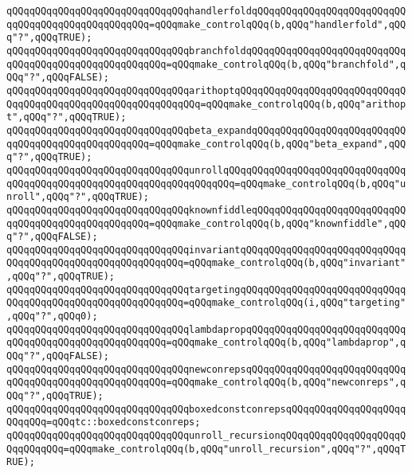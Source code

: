 \verb|qQQqqQQqqQQqqQQqqQQqqQQqqQQqqQQqhandlerfoldqQQqqQQqqQQqqQQqqQQqqQQqqQQqqQQqqQQqqQQqqQQqqQQqqQQq=qQQqmake_controlqQQq(b,qQQq"handlerfold",qQQq"?",qQQqTRUE);|\newline
\verb|qQQqqQQqqQQqqQQqqQQqqQQqqQQqqQQqbranchfoldqQQqqQQqqQQqqQQqqQQqqQQqqQQqqQQqqQQqqQQqqQQqqQQqqQQqqQQq=qQQqmake_controlqQQq(b,qQQq"branchfold",qQQq"?",qQQqFALSE);|\newline
\newline
\verb|qQQqqQQqqQQqqQQqqQQqqQQqqQQqqQQqarithoptqQQqqQQqqQQqqQQqqQQqqQQqqQQqqQQqqQQqqQQqqQQqqQQqqQQqqQQqqQQqqQQq=qQQqmake_controlqQQq(b,qQQq"arithopt",qQQq"?",qQQqTRUE);|\newline
\verb|qQQqqQQqqQQqqQQqqQQqqQQqqQQqqQQqbeta_expandqQQqqQQqqQQqqQQqqQQqqQQqqQQqqQQqqQQqqQQqqQQqqQQqqQQq=qQQqmake_controlqQQq(b,qQQq"beta_expand",qQQq"?",qQQqTRUE);|\newline
\verb|qQQqqQQqqQQqqQQqqQQqqQQqqQQqqQQqunrollqQQqqQQqqQQqqQQqqQQqqQQqqQQqqQQqqQQqqQQqqQQqqQQqqQQqqQQqqQQqqQQqqQQqqQQq=qQQqmake_controlqQQq(b,qQQq"unroll",qQQq"?",qQQqTRUE);|\newline
\newline
\verb|qQQqqQQqqQQqqQQqqQQqqQQqqQQqqQQqknownfiddleqQQqqQQqqQQqqQQqqQQqqQQqqQQqqQQqqQQqqQQqqQQqqQQqqQQq=qQQqmake_controlqQQq(b,qQQq"knownfiddle",qQQq"?",qQQqFALSE);|\newline
\verb|qQQqqQQqqQQqqQQqqQQqqQQqqQQqqQQqinvariantqQQqqQQqqQQqqQQqqQQqqQQqqQQqqQQqqQQqqQQqqQQqqQQqqQQqqQQqqQQq=qQQqmake_controlqQQq(b,qQQq"invariant",qQQq"?",qQQqTRUE);|\newline
\verb|qQQqqQQqqQQqqQQqqQQqqQQqqQQqqQQqtargetingqQQqqQQqqQQqqQQqqQQqqQQqqQQqqQQqqQQqqQQqqQQqqQQqqQQqqQQqqQQq=qQQqmake_controlqQQq(i,qQQq"targeting",qQQq"?",qQQq0);|\newline
\newline
\verb|qQQqqQQqqQQqqQQqqQQqqQQqqQQqqQQqlambdapropqQQqqQQqqQQqqQQqqQQqqQQqqQQqqQQqqQQqqQQqqQQqqQQqqQQqqQQq=qQQqmake_controlqQQq(b,qQQq"lambdaprop",qQQq"?",qQQqFALSE);|\newline
\verb|qQQqqQQqqQQqqQQqqQQqqQQqqQQqqQQqnewconrepsqQQqqQQqqQQqqQQqqQQqqQQqqQQqqQQqqQQqqQQqqQQqqQQqqQQqqQQq=qQQqmake_controlqQQq(b,qQQq"newconreps",qQQq"?",qQQqTRUE);|\newline
\newline
\verb|qQQqqQQqqQQqqQQqqQQqqQQqqQQqqQQqboxedconstconrepsqQQqqQQqqQQqqQQqqQQqqQQqqQQq=qQQqtc::boxedconstconreps;|\newline
\newline
\verb|qQQqqQQqqQQqqQQqqQQqqQQqqQQqqQQqunroll_recursionqQQqqQQqqQQqqQQqqQQqqQQqqQQqqQQq=qQQqmake_controlqQQq(b,qQQq"unroll_recursion",qQQq"?",qQQqTRUE);|\newline
